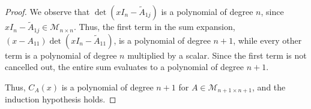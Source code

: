 \documentclass[12pt, a4paper]{article}
\begin{document}
\begin{proof}
    We observe that $\det \left(xI_n - \tilde{A}_{1j}\right)$ is a polynomial
    of degree $n$, since $xI_n - \tilde{A}_{1j} \in \mathcal{M}_{n \times n}$.
    Thus, the first term in the sum expansion,
    $(x - A_{11})\det\left(xI_n - \tilde{A}_{11}\right)$, is a polynomial
    of degree $n + 1$, while every other term is a polynomial of degree $n$
    multiplied by a scalar. Since the first term is not cancelled out,
    the entire sum evaluates to a polynomial of degree $n + 1$.

    Thus, $C_A(x)$ is a polynomial of degree $n + 1$ for
    $A \in \mathcal{M}_{n+1\times n+1}$, and the induction hypothesis holds.
\end{proof}
\end{document}
